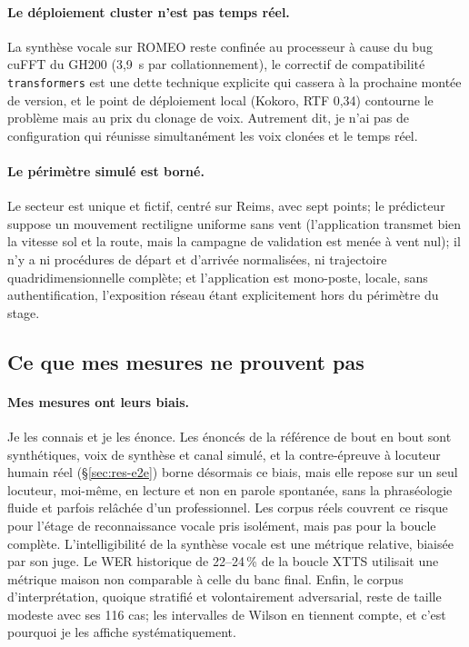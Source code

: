 \documentclass[11pt,a4paper]{article}
\begin{document}
\paragraph{Le déploiement cluster n'est pas temps réel.} La synthèse vocale sur ROMEO reste confinée au processeur à cause du bug cuFFT du GH200 (3,9~s par collationnement), le correctif de compatibilité \texttt{transformers} est une dette technique explicite qui cassera à la prochaine montée de version, et le point de déploiement local (Kokoro, RTF 0,34) contourne le problème mais au prix du clonage de voix. Autrement dit, je n'ai pas de configuration qui réunisse simultanément les voix clonées et le temps réel.

\paragraph{Le périmètre simulé est borné.} Le secteur est unique et fictif, centré sur Reims, avec sept points; le prédicteur suppose un mouvement rectiligne uniforme sans vent (l'application transmet bien la vitesse sol et la route, mais la campagne de validation est menée à vent nul); il n'y a ni procédures de départ et d'arrivée normalisées, ni trajectoire quadridimensionnelle complète; et l'application est mono-poste, locale, sans authentification, l'exposition réseau étant explicitement hors du périmètre du stage.

\subsection{Ce que mes mesures ne prouvent pas}

\paragraph{Mes mesures ont leurs biais.} Je les connais et je les énonce. Les énoncés de la référence de bout en bout sont synthétiques, voix de synthèse et canal simulé, et la contre-épreuve à locuteur humain réel (\S\ref{sec:res-e2e}) borne désormais ce biais, mais elle repose sur un seul locuteur, moi-même, en lecture et non en parole spontanée, sans la phraséologie fluide et parfois relâchée d'un professionnel. Les corpus réels couvrent ce risque pour l'étage de reconnaissance vocale pris isolément, mais pas pour la boucle complète. L'intelligibilité de la synthèse vocale est une métrique relative, biaisée par son juge. Le WER historique de 22--24\,\% de la boucle XTTS utilisait une métrique maison non comparable à celle du banc final. Enfin, le corpus d'interprétation, quoique stratifié et volontairement adversarial, reste de taille modeste avec ses 116 cas; les intervalles de Wilson en tiennent compte, et c'est pourquoi je les affiche systématiquement. 
\end{document}
